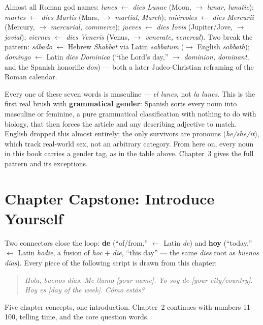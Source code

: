 \begin{etymology}
Almost all Roman god names: \emph{lunes} $\leftarrow$ \emph{dies Lunae}
(Moon, $\to$ \emph{lunar, lunatic}); \emph{martes} $\leftarrow$ \emph{dies
Martis} (Mars, $\to$ \emph{martial}, \emph{March}); \emph{mi\'{e}rcoles}
$\leftarrow$ \emph{dies Mercurii} (Mercury, $\to$ \emph{mercurial,
commerce}); \emph{jueves} $\leftarrow$ \emph{dies Iovis} (Jupiter/Jove,
$\to$ \emph{jovial}); \emph{viernes} $\leftarrow$ \emph{dies Veneris}
(Venus, $\to$ \emph{venerate, venereal}). Two break the pattern:
\emph{s\'{a}bado} $\leftarrow$ Hebrew \emph{Shabbat} via Latin
\emph{sabbatum} ($\to$ English \emph{sabbath}); \emph{domingo} $\leftarrow$
Latin \emph{dies Dominica} (``the Lord's day,'' $\to$ \emph{dominion,
dominant}, and the Spanish honorific \emph{don}) --- both a later
Judeo-Christian reframing of the Roman calendar.
\end{etymology}

\begin{grammarlens}
Every one of these seven words is masculine --- \emph{el lunes}, not
\emph{la lunes}. This is the first real brush with \textbf{grammatical
gender}: Spanish sorts every noun into masculine or feminine, a pure
grammatical classification with nothing to do with biology, that then
forces the article and any describing adjective to match. English dropped
this almost entirely; the only survivors are pronouns (\emph{he/she/it}),
which track real-world sex, not an arbitrary category. From here on, every
noun in this book carries a gender tag, as in the table above. Chapter~3
gives the full pattern and its exceptions.
\end{grammarlens}

\section{Chapter Capstone: Introduce Yourself}

Two connectors close the loop: \textbf{de} (``of/from,'' $\leftarrow$
Latin \emph{de}) and \textbf{hoy} (``today,'' $\leftarrow$ Latin
\emph{hodie}, a fusion of \emph{hoc} + \emph{die}, ``this day'' --- the same
\emph{dies} root as \emph{buenos d\'{i}as}). Every piece of the following
script is drawn from this chapter:

\begin{quote}
\itshape
Hola, buenos d\'{i}as. Me llamo [your name]. Yo soy de [your city/country].
Hoy es [day of the week]. \textquestiondown C\'{o}mo est\'{a}s?
\end{quote}

Five chapter concepts, one introduction. Chapter~2 continues with numbers
11--100, telling time, and the core question words.
